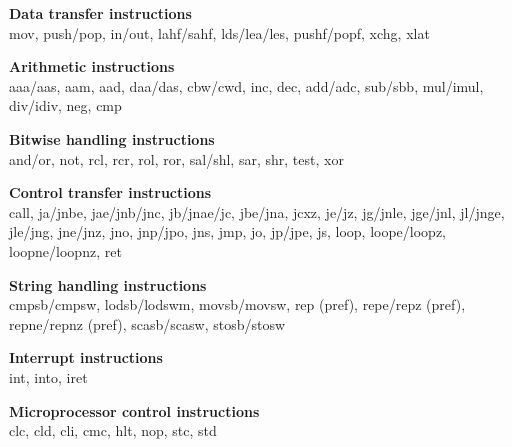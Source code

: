 \documentclass[conference]{IEEEtran}
\begin{document}
{\noindent\bf Data transfer instructions} \\
mov, push/pop, in/out, lahf/sahf, lds/lea/les, pushf/popf, xchg, xlat

{\noindent\bf Arithmetic instructions} \\
aaa/aas, aam, aad, daa/das, cbw/cwd, inc, dec, add/adc, sub/sbb, mul/imul, div/idiv, neg, cmp

{\noindent\bf Bitwise handling instructions} \\
and/or, not, rcl, rcr, rol, ror, sal/shl, sar, shr, test, xor

{\noindent\bf Control transfer instructions} \\
call, ja/jnbe, jae/jnb/jnc, jb/jnae/jc, jbe/jna, jcxz, je/jz, jg/jnle, jge/jnl, jl/jnge, jle/jng, jne/jnz, jno, jnp/jpo, jns, jmp, jo, jp/jpe, js, loop, loope/loopz, loopne/loopnz, ret

{\noindent\bf String handling instructions}\\
cmpsb/cmpsw, lodsb/lodswm, movsb/movsw, rep (pref), repe/repz (pref), repne/repnz (pref), scasb/scasw, stosb/stosw

{\noindent\bf Interrupt instructions} \\
int, into, iret

{\noindent\bf Microprocessor control instructions} \\
clc, cld, cli, cmc, hlt, nop, stc, std





\end{document}
